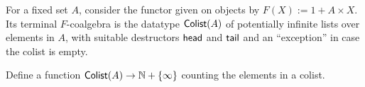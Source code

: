 \begin{exer}
  For a fixed set $A$, consider the functor given on objects by $F(X) := 1 + A \times X$.
  Its terminal $F$-coalgebra is the datatype $\mathsf{Colist}(A)$ of potentially infinite lists over elements in $A$, with suitable destructors $\mathsf{head}$ and $\mathsf{tail}$ and an ``exception'' in case the colist is empty.

  Define a function $\mathsf{Colist}(A) \to  \mathbb{N} + \{\infty\}$ counting the elements in a colist.
  
\end{exer}


